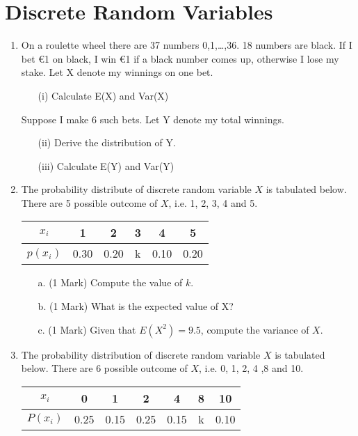 \documentclass[]{report}
\begin{document}
\section*{Discrete Random Variables}
	\begin{enumerate}
		\item  On a roulette wheel there are 37 numbers {0,1,…,36}. 18 numbers are black. If I bet €1 on black, I win €1 if a black number comes up, otherwise I lose my stake. Let X denote my winnings on one bet.
		\begin{itemize}
		\item[(i)]	Calculate E(X) and Var(X)
		\end{itemize}
		
		
		Suppose I make 6 such bets. Let Y denote my total winnings. 
	\begin{itemize}
		\item[(ii)]	Derive the distribution of Y.
	\item[(iii)]	Calculate E(Y) and Var(Y)
	\end{itemize}	

\item The probability distribute of discrete random variable $X$ is tabulated below. There are 5 possible outcome of $X$, i.e. 1, 2, 3, 4 and 5.
	\begin{center}
		\begin{tabular}{|c||c|c|c|c|c|}
			\hline
			$x_i$  & 1 & 2 & 3 & 4 & 5  \\\hline
			$p(x_i)$ & 0.30 & 0.20 & k & 0.10 & 0.20 \\
			\hline
		\end{tabular}
	\end{center}
	
	\begin{itemize}
		\item[a.] (1 Mark) Compute the value of $k$.
		\item[b.] (1 Mark) What is the expected value of X?
		\item[c.] (1 Mark) Given that $E(X^2) = 9.5$, compute the variance of $X$.
	\end{itemize}

	\item  The probability distribution of discrete random variable $X$ is tabulated below. There are 6 possible outcome of $X$, i.e. 0, 1, 2, 4 ,8 and 10.
	\begin{center}
		\begin{tabular}{|c||c|c|c|c|c|c|}
			\hline
			$x_i$  & 0 & 1 & 2 & 4 & 8 & 10 \\\hline
			$P(x_i)$ & 0.25 & 0.15 & 0.25 & 0.15 & k & 0.10\\
			\hline
		\end{tabular}
	\end{center}
	

\end{enumerate}
\end{document}

